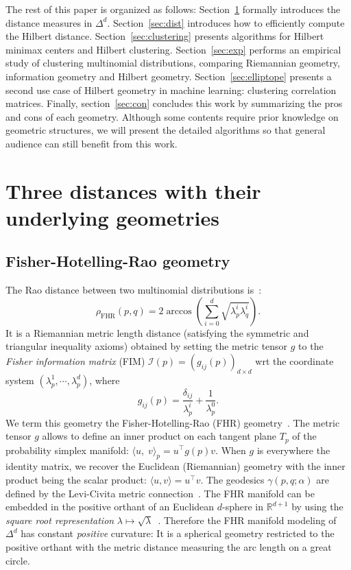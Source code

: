 \documentclass[graybox]{svmult}
\def\bbR{\mathbb{R}}
\def\Finner#1#2#3{{\langle {#1},\;{#2} \rangle}_{#3}}
\def\inner#1#2{ \langle {#1},{#2} \rangle }
\def\FHR{\mathrm{FHR}}
\begin{document}
The rest of this paper is organized as follows:
Section~\ref{sec:distances} formally introduces the distance measures in $\Delta^d$.
Section~\ref{sec:dist} introduces how to efficiently compute the Hilbert distance.
Section~\ref{sec:clustering} presents algorithms for Hilbert minimax centers and Hilbert clustering.
Section~\ref{sec:exp} performs an empirical study of clustering multinomial distributions,
comparing Riemannian geometry, information geometry and Hilbert geometry.
Section~\ref{sec:elliptope} presents a second use case of Hilbert geometry in machine learning:
clustering correlation matrices.
Finally, section~\ref{sec:con} concludes this work by summarizing the pros and cons of each geometry.
Although some contents require prior knowledge on geometric structures, 
we will present the detailed algorithms so that general audience can still benefit from this work.

\section{Three distances with their underlying geometries}\label{sec:distances}

\subsection{Fisher-Hotelling-Rao geometry}

The Rao distance between two multinomial distributions is~\cite{KassVos-1997,MetricLearning-2002}:
\begin{equation}
\rho_{\FHR}(p,q) = 2\arccos\left(\sum_{i=0}^{d} \sqrt{\lambda_p^i\lambda_q^i}\right).
\end{equation}
It is a Riemannian metric length distance (satisfying the symmetric and triangular inequality axioms)
obtained by setting the metric tensor $g$ to the {\em Fisher information matrix} (FIM)
$\mathcal{I}(p)=(g_{ij}(p))_{d\times{d}}$ wrt the coordinate system $(\lambda_p^1,\cdots,\lambda_p^d)$,
where
$$
g_{ij}(p) = \frac{\delta_{ij}}{\lambda_p^i} + \frac{1}{\lambda_p^0}.
$$
We term this geometry the Fisher-Hotelling-Rao (FHR) geometry~\cite{Hotelling-1930,storyLM-2007,Rao-1945,Rao-reprint-1992}.
The metric tensor $g$ allows to define an inner product on each tangent plane $T_p$ of the probability simplex manifold: $\Finner{u}{v}{p}=u^\top g(p) v$.
When $g$ is everywhere the identity matrix, we recover the Euclidean (Riemannian) geometry with the inner product being the scalar product: $\inner{u}{v}=u^\top v$.
The geodesics $\gamma(p,q;\alpha)$ are defined by the Levi-Civita metric connection~\cite{IG-2016,IG-2014}.
The FHR manifold can be embedded in the positive orthant of an Euclidean $d$-sphere in $\bbR^{d+1}$
by using the {\em square root representation} $\lambda\mapsto\sqrt{\lambda}$~\cite{KassVos-1997}.
Therefore the FHR manifold modeling of $\Delta^d$ has constant {\em positive} curvature: It is a
spherical geometry restricted to the positive orthant with the metric distance measuring the arc length on a great circle.
\end{document}
